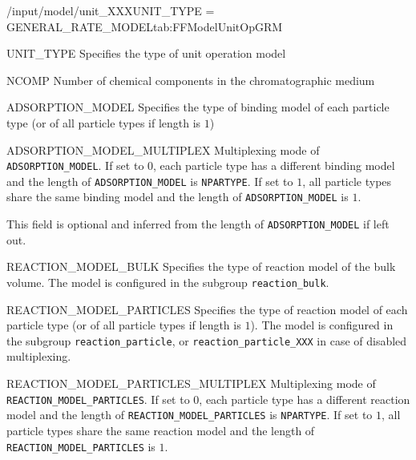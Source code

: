 \begin{condsubgroup}{/input/model/unit\_XXX}{UNIT\_TYPE = GENERAL\_RATE\_MODEL}{tab:FFModelUnitOpGRM}
  \begin{dataset}[type=string,range={\texttt{GENERAL\_RATE\_MODEL}},length=1]{UNIT\_TYPE}
    Specifies the type of unit operation model
  \end{dataset}
  \begin{dataset}[type=int,range={$\geq 1$},length=1]{NCOMP}
    Number of chemical components in the chromatographic medium
  \end{dataset}
  \begin{dataset}[type=string,range={See Section~\ref{sec:FFAdsorption}},length={$1$ / \texttt{NPARTYPE}}]{ADSORPTION\_MODEL}
    Specifies the type of binding model of each particle type (or of all particle types if length is $1$)
  \end{dataset}
  \begin{dataset}[unit=--,type=int,range={$\{0, 1\}$},length={1}]{ADSORPTION\_MODEL\_MULTIPLEX}
    Multiplexing mode of \texttt{ADSORPTION\_MODEL}.
    If set to $0$, each particle type has a different binding model and the length of \texttt{ADSORPTION\_MODEL} is \texttt{NPARTYPE}.
    If set to $1$, all particle types share the same binding model and the length of \texttt{ADSORPTION\_MODEL} is $1$.

    This field is optional and inferred from the length of \texttt{ADSORPTION\_MODEL} if left out.
  \end{dataset}
  \begin{dataset}[type=string,range={See Section~\ref{sec:FFReaction}},length=1]{REACTION\_MODEL\_BULK}
    Specifies the type of reaction model of the bulk volume.
    The model is configured in the subgroup \texttt{reaction\_bulk}.
  \end{dataset}
  \begin{dataset}[type=string,range={See Section~\ref{sec:FFReaction}},length={$1$ / \texttt{NPARTYPE}}]{REACTION\_MODEL\_PARTICLES}
    Specifies the type of reaction model of each particle type (or of all particle types if length is $1$).
    The model is configured in the subgroup \texttt{reaction\_particle}, or \texttt{reaction\_particle\_XXX} in case of disabled multiplexing.
  \end{dataset}
  \begin{dataset}[unit=--,type=int,range={$\{0, 1\}$},length={1}]{REACTION\_MODEL\_PARTICLES\_MULTIPLEX}
    Multiplexing mode of \texttt{REACTION\_MODEL\_PARTICLES}.
    If set to $0$, each particle type has a different reaction model and the length of \texttt{REACTION\_MODEL\_PARTICLES} is \texttt{NPARTYPE}.
    If set to $1$, all particle types share the same reaction model and the length of \texttt{REACTION\_MODEL\_PARTICLES} is $1$.


\end{dataset}
\end{condsubgroup}

